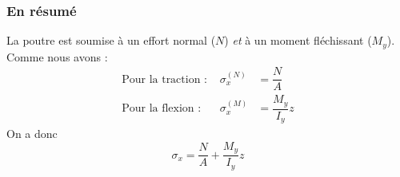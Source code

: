 		\subsubsection{En résumé}
		La poutre est soumise à un effort normal ($N$) \textit{et} à un moment 
		fléchissant ($M_y$). Comme nous avons :
		\begin{equation}
		\begin{array}{lll}
		\text{Pour la traction : } & \sigma_x^{(N)} &= \dfrac{N}{A}\\
		\text{Pour la flexion : } & \sigma_x^{(M)} &= \dfrac{M_y}{I_y}z		
		\end{array}
		\end{equation}
		On a donc
		\begin{equation}
		\sigma_x = \dfrac{N}{A}+\dfrac{M_y}{I_y}z
		\end{equation}
	
	
	
	
	
	
	
	
	
	
	
	
	
	
	
	
	
